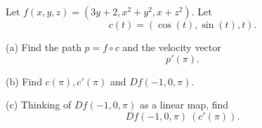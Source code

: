 \documentclass[openany]{book}
\begin{document}
\begin{prob}[2.5, Q11]
Let \( f(x, y, z) = (3y + 2, x^2 + y^2, x + z^2) \). Let  
\[
c(t) = (\cos(t), \sin(t), t).
\]  

(a) Find the path \( p = f \circ c \) and the velocity vector  
\[
p'(\pi).
\]  

(b) Find \( c(\pi), c'(\pi) \) and \( Df(-1, 0, \pi). \)  

(c) Thinking of \( Df(-1, 0, \pi) \) as a linear map, find  
\[
Df(-1, 0, \pi) \ (c'(\pi)).
\]
\end{prob}
\end{document}
